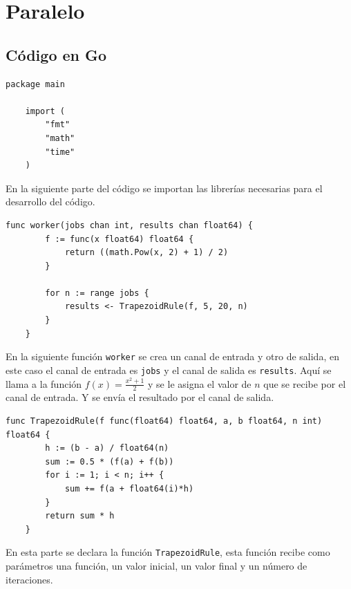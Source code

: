 \documentclass[a4paper]{article}
\begin{document}
\section{Paralelo}
\subsection{Código en Go}

\begin{lstlisting}[style=Golang]
    package main

    import (
        "fmt"
        "math"
        "time"
    )
\end{lstlisting}
En la siguiente parte del código se importan las librerías necesarias para el desarrollo del código.


\begin{lstlisting}[style=Golang,firstnumber=9]
    func worker(jobs chan int, results chan float64) {
        f := func(x float64) float64 {
            return ((math.Pow(x, 2) + 1) / 2)
        }
    
        for n := range jobs {
            results <- TrapezoidRule(f, 5, 20, n)
        }
    }
\end{lstlisting}
En la siguiente función \texttt{worker} se crea un canal de entrada y otro de salida, en este caso el canal de entrada es \texttt{jobs} y el canal de salida es \texttt{results}.
Aquí se llama a la función $f(x) = \frac{x^2+1}{2}$ y se le asigna el valor de $n$ que se recibe por el canal de entrada. Y se envía el resultado por el canal de salida.
\\

\begin{lstlisting}[style=Golang,firstnumber=19]
    func TrapezoidRule(f func(float64) float64, a, b float64, n int) float64 {
        h := (b - a) / float64(n)
        sum := 0.5 * (f(a) + f(b))
        for i := 1; i < n; i++ {
            sum += f(a + float64(i)*h)
        }
        return sum * h
    }

\end{lstlisting}
En esta parte se declara la función \texttt{TrapezoidRule}, esta función recibe como parámetros una función, un valor inicial, un valor final y un número de iteraciones.
\\
\end{document}

